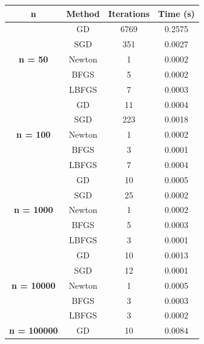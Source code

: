 \documentclass[9pt]{IEEEtran}
\begin{document}
    \begin{table}[ht]
        \centering
        \begin{tabular}{|c|c|c|c|}
        \hline
        \textbf{n} & \textbf{Method} & \textbf{Iterations} & \textbf{Time (s)} \\
        \hline
        \multirow{5}{*}{\textbf{n = 50}} & GD    & 6769  & 0.2575 \\
                                         & SGD   & 351   & 0.0027 \\
                                         & Newton& 1     & 0.0002 \\
                                         & BFGS  & 5     & 0.0002 \\
                                         & LBFGS & 7     & 0.0003 \\
        \hline
        \multirow{5}{*}{\textbf{n = 100}} & GD    & 11    & 0.0004 \\
                                         & SGD   & 223   & 0.0018 \\
                                         & Newton& 1     & 0.0002 \\
                                         & BFGS  & 3     & 0.0001 \\
                                         & LBFGS & 7     & 0.0004 \\
        \hline
        \multirow{5}{*}{\textbf{n = 1000}} & GD    & 10    & 0.0005 \\
                                         & SGD   & 25    & 0.0002 \\
                                         & Newton& 1     & 0.0002 \\
                                         & BFGS  & 5     & 0.0003 \\
                                         & LBFGS & 3     & 0.0001 \\
        \hline
        \multirow{5}{*}{\textbf{n = 10000}} & GD    & 10    & 0.0013 \\
                                         & SGD   & 12    & 0.0001 \\
                                         & Newton& 1     & 0.0005 \\
                                         & BFGS  & 3     & 0.0003 \\
                                         & LBFGS & 3     & 0.0002 \\
        \hline
        \multirow{5}{*}{\textbf{n = 100000}} & GD    & 10    & 0.0084 \\

\end{tabular}
\end{table}
\end{document}
